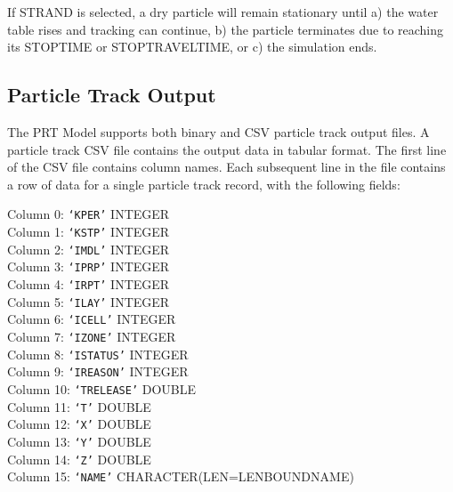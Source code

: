 If STRAND is selected, a dry particle will remain stationary until a) the water table rises and tracking can continue, b) the particle terminates due to reaching its STOPTIME or STOPTRAVELTIME, or c) the simulation ends.

\subsection{Particle Track Output}

The PRT Model supports both binary and CSV particle track output files. A particle track CSV file contains the output data in tabular format. The first line of the CSV file contains column names. Each subsequent line in the file contains a row of data for a single particle track record, with the following fields:

\vspace{5mm}
\noindent Column 0: \texttt{`KPER'} {\color{red} \footnotesize{INTEGER}} \\
\noindent Column 1: \texttt{`KSTP'} {\color{red} \footnotesize{INTEGER}} \\
\noindent Column 2: \texttt{`IMDL'} {\color{red} \footnotesize{INTEGER}} \\
\noindent Column 3: \texttt{`IPRP'} {\color{red} \footnotesize{INTEGER}} \\
\noindent Column 4: \texttt{`IRPT'} {\color{red} \footnotesize{INTEGER}} \\
\noindent Column 5: \texttt{`ILAY'} {\color{red} \footnotesize{INTEGER}} \\
\noindent Column 6: \texttt{`ICELL'} {\color{red} \footnotesize{INTEGER}} \\
\noindent Column 7: \texttt{`IZONE'} {\color{red} \footnotesize{INTEGER}} \\
\noindent Column 8: \texttt{`ISTATUS'} {\color{red} \footnotesize{INTEGER}} \\
\noindent Column 9: \texttt{`IREASON'} {\color{red} \footnotesize{INTEGER}} \\
\noindent Column 10: \texttt{`TRELEASE'} {\color{red} \footnotesize{DOUBLE}} \\
\noindent Column 11: \texttt{`T'} {\color{red} \footnotesize{DOUBLE}} \\
\noindent Column 12: \texttt{`X'} {\color{red} \footnotesize{DOUBLE}} \\
\noindent Column 13: \texttt{`Y'} {\color{red} \footnotesize{DOUBLE}} \\
\noindent Column 14: \texttt{`Z'} {\color{red} \footnotesize{DOUBLE}} \\
\noindent Column 15: \texttt{`NAME'} {\color{red} \footnotesize{CHARACTER(LEN=LENBOUNDNAME)}} \\


